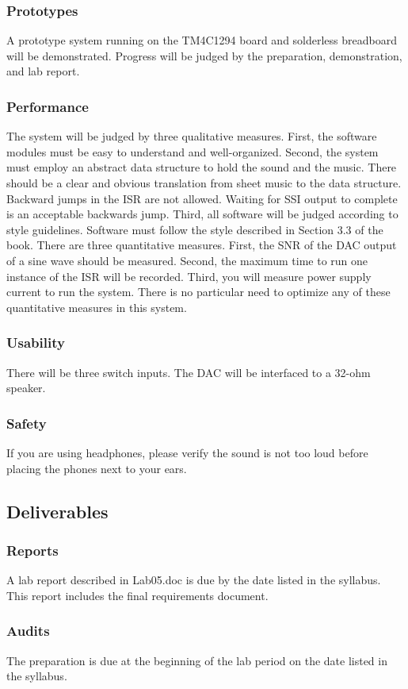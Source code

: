 \documentclass{article}
\begin{document}
		\subsubsection{Prototypes}
			A prototype system running on the TM4C1294 board and solderless breadboard will be demonstrated. Progress will be judged by the preparation, demonstration, and lab report.
		\subsubsection{Performance}
			The system will be judged by three qualitative measures. First, the software modules must be easy to understand and well-organized. Second, the system must employ an abstract data structure to hold the sound and the music. There should be a clear and obvious translation from sheet music to the data structure. Backward jumps in the ISR are not allowed. Waiting for SSI output to complete is an acceptable backwards jump. Third, all software will be judged according to style guidelines. Software must follow the style described in Section 3.3 of the book. There are three quantitative measures. First, the SNR of the DAC output of a sine wave should be measured. Second, the maximum time to run one instance of the ISR will be recorded. Third, you will measure power supply current to run the system. There is no particular need to optimize any of these quantitative measures in this system.
		\subsubsection{Usability}
			There will be three switch inputs. The DAC will be interfaced to a 32-ohm speaker.
		\subsubsection{Safety}
			If you are using headphones, please verify the sound is not too loud before placing the phones next to your ears.
	\subsection{Deliverables}

		\subsubsection{Reports}
			A lab report described in Lab05.doc is due by the date listed in the syllabus. This report includes the final requirements document.
		\subsubsection{Audits}
			The preparation is due at the beginning of the lab period on the date listed in the syllabus.
\end{document}
